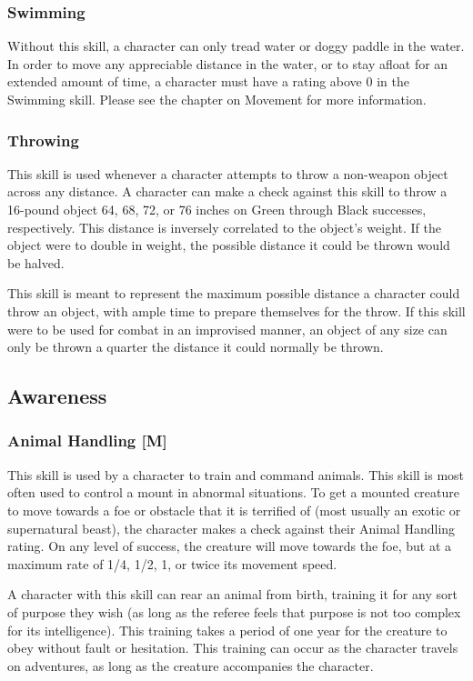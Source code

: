 \documentclass[oneside]{book}
\begin{document}
\begin{multicols}{2}
\subsubsection{Swimming}
Without this skill, a character can only tread water or doggy paddle in the water. In order to move any appreciable distance in the water, or to stay afloat for an extended amount of time, a character must have a rating above 0 in the Swimming skill. Please see the chapter on Movement for more information.

\subsubsection{Throwing}
This skill is used whenever a character attempts to throw a non-weapon object across any distance. A character can make a check against this skill to throw a 16-pound object 64, 68, 72, or 76 inches on Green through Black successes, respectively. This distance is inversely correlated to the object's weight. If the object were to double in weight, the possible distance it could be thrown would be halved. 

This skill is meant to represent the maximum possible distance a character could throw an object, with ample time to prepare themselves for the throw. If this skill were to be used for combat in an improvised manner, an object of any size can only be thrown a quarter the distance it could normally be thrown.

\subsection{Awareness}
\subsubsection{Animal Handling [M]}
This skill is used by a character to train and command animals. This skill is most often used to control a mount in abnormal situations. To get a mounted creature to move towards a foe or obstacle that it is terrified of (most usually an exotic or supernatural beast), the character makes a check against their Animal Handling rating. On any level of success, the creature will move towards the foe, but at a maximum rate of 1/4, 1/2, 1, or twice its movement speed.

A character with this skill can rear an animal from birth, training it for any sort of purpose they wish (as long as the referee feels that purpose is not too complex for its intelligence). This training takes a period of one year for the creature to obey without fault or hesitation. This training can occur as the character travels on adventures, as long as the creature accompanies the character. 


\end{multicols}
\end{document}
